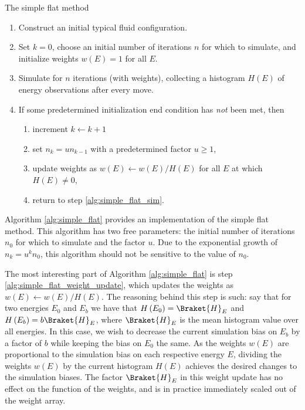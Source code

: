 \documentclass[11pt]{article}
\newcommand{\bk}{\Braket} %
\newcommand{\p}[1]{\left(#1\right)} %
\newenvironment{alg}
{\hrulefill\begin{enumerate}}
{\end{enumerate}\hrulefill}
\begin{document}
\begin{algorithm}[tb]
  \caption{The simple flat method}
  \label{alg:simple_flat}
  \begin{alg}

  \item Construct an initial typical fluid configuration.

  \item Set $k=0$, choose an initial number of iterations $n$ for
    which to simulate, and initialize weights $w\p{E}=1$ for all $E$.

  \item Simulate for $n$ iterations (with weights), collecting a
    histogram $H\p{E}$ of energy observations after every move.
    \label{alg:simple_flat_sim}

  \item If some predetermined initialization end condition has
    \emph{not} been met, then
    \begin{enumerate}
    \item increment $k\leftarrow k+1$
    \item set $n_k=un_{k-1}$ with a predetermined factor $u\ge1$,
      \label{alg:simple_flat_f}
    \item update weights as $w\p{E}\leftarrow w\p{E}/H\p{E}$ for all
      $E$ at which $H\p{E}\ne0$,
      \label{alg:simple_flat_weight_update}
    \item return to step \ref{alg:simple_flat_sim}.
    \end{enumerate}

  \end{alg}
\end{algorithm}

Algorithm \ref{alg:simple_flat} provides an implementation of the
simple flat method. This algorithm has two free parameters: the
initial number of iterations $n_0$ for which to simulate and the
factor $u$. Due to the exponential growth of $n_k=u^kn_0$, this
algorithm should not be sensitive to the value of $n_0$.

The most interesting part of Algorithm \ref{alg:simple_flat} is step
\ref{alg:simple_flat_weight_update}, which updates the weights as
$w\p{E}\leftarrow w\p{E}/H\p{E}$. The reasoning behind this step is
such: say that for two energies $E_0$ and $E_b$ we have that
$H\p{E_0}=\bk{H}_E$ and $H\p{E_b}=b\bk{H}_E$, where $\bk{H}_E$ is the
mean histogram value over all energies. In this case, we wish to
decrease the current simulation bias on $E_b$ by a factor of $b$ while
keeping the bias on $E_0$ the same. As the weights $w\p{E}$ are
proportional to the simulation bias on each respective energy $E$,
dividing the weights $w\p{E}$ by the current histogram $H\p{E}$
achieves the desired changes to the simulation biases. The factor
$\bk{H}_E$ in this weight update has no effect on the function of the
weights, and is in practice immediately scaled out of the weight
array.
\end{document}
